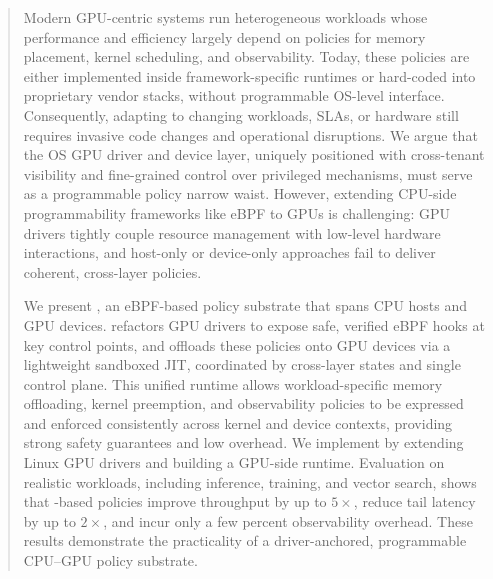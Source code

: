 \begin{abstract}
Modern GPU-centric systems run heterogeneous workloads whose performance and efficiency largely depend on policies for memory placement, kernel scheduling, and observability. Today, these policies are either implemented inside framework-specific runtimes or hard-coded into proprietary vendor stacks, without programmable OS-level interface. Consequently, adapting to changing workloads, SLAs, or hardware still requires invasive code changes and operational disruptions. We argue that the OS GPU driver and device layer, uniquely positioned with cross-tenant visibility and fine-grained control over privileged mechanisms, must serve as a programmable policy narrow waist. However, extending CPU-side programmability frameworks like eBPF to GPUs is challenging: GPU drivers tightly couple resource management with low-level hardware interactions, and host-only or device-only approaches fail to deliver coherent, cross-layer policies.

We present \sys, an eBPF-based policy substrate that spans CPU hosts and GPU devices. \sys refactors GPU drivers to expose safe, verified eBPF hooks at key control points, and offloads these policies onto GPU devices via a lightweight sandboxed JIT, coordinated by cross-layer states and single control plane. This unified runtime allows workload-specific memory offloading, kernel preemption, and observability policies to be expressed and enforced consistently across kernel and device contexts, providing strong safety guarantees and low overhead. We implement \sys by extending Linux GPU drivers and building a GPU-side runtime. Evaluation on realistic workloads, including inference, training, and vector search, shows that \sys-based policies improve throughput by up to $5\times$, reduce tail latency by up to $2\times$, and incur only a few percent observability overhead. These results demonstrate the practicality of a driver-anchored, programmable CPU–GPU policy substrate.


\end{abstract}

